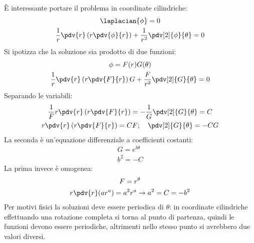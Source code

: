 %
È interessante portare il problema in coordinate cilindriche:
%
	\begin{equation*}
		\begin{gathered}
			\laplacian{\phi} = 0\\
			\frac{1}{r} \pdv{r} \left( r \pdv{\phi}{r} \right) + \frac{1}{r^2} \pdv[2]{\phi}{\theta} = 0
		\end{gathered}
	\end{equation*}
%
Si ipotizza che la soluzione sia prodotto di due funzioni:
%
	\begin{equation*}
		\begin{gathered}
			\phi = F(r) G(\theta)\\
			\frac{1}{r} \pdv{r} \left( r \pdv{F}{r} \right) G + \frac{F}{r^2} \pdv[2]{G}{\theta} = 0
		\end{gathered}
	\end{equation*}
%
Separando le variabili:
%
	\begin{equation*}
		\begin{gathered}
			\frac{1}{F} r \pdv{r} \left( r \pdv{F}{r} \right) = - \frac{1}{G} \pdv[2]{G}{\theta} = C\\
			r \pdv{r} \left( r \pdv{F}{r}\right) = CF; \quad \pdv[2]{G}{\theta} = - CG
		\end{gathered}
	\end{equation*}
%
La seconda è un'equazione differenziale a coefficienti costanti:
%
	\begin{equation*}
		\begin{gathered}
			G = e^{b \theta}\\
			b^2 = - C
		\end{gathered}
	\end{equation*}
%
La prima invece è omogenea:
%
	\begin{equation*}
		\begin{gathered}
			F = r^{\theta}\\
			r \pdv{r} ( a r^a ) = a^2 r^a \rightarrow a^2 = C = -b^2
		\end{gathered}
	\end{equation*}
%
Per motivi fisici la soluzioni deve essere periodica di $\theta$: in coordinate cilindriche effettuando una rotazione completa si torna al punto di partenza, quindi le funzioni devono essere periodiche, altrimenti nello stesso punto si avrebbero due valori diversi.
%
